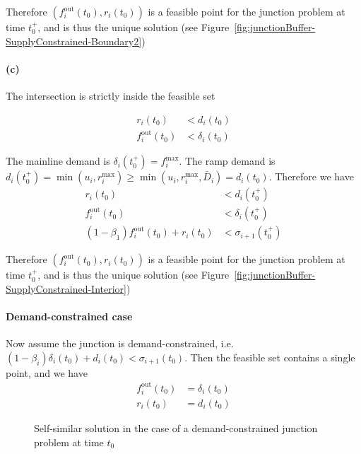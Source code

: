 Therefore $(f_i^{\text{out}}(t_0), r_i(t_0))$ is a feasible point for the junction problem at time $t_0^+$, and is thus the unique solution (see Figure~\ref{fig:junctionBuffer-SupplyConstrained-Boundary2})

\paragraph{(c)} The intersection is strictly inside the feasible set

\begin{align*}
r_i(t_0) &< d_i(t_0) \\
f^{\text{out}}_i(t_0) &< \delta_i(t_0)
\end{align*}

The mainline demand is $\delta_i(t_0^+) = f_i^{\max}$. The ramp demand is $d_i(t_0^+) = \min (u_i, r_i^{\max}) \geq  \min (u_i, r_i^{\max}, \bar{D}_i) = d_i(t_0)$. Therefore we have
\begin{align*}
r_i(t_0) &< d_i(t_0^+) \\
f_i^{\text{out}}(t_0) &< \delta_i(t_0^+) \\
(1-\beta_1)f_i^{\text{out}}(t_0) + r_i(t_0) &< \sigma_{i+1}(t_0^+)
\end{align*}

Therefore $(f_i^{\text{out}}(t_0), r_i(t_0))$ is a feasible point for the junction problem at time $t_0^+$, and is thus the unique solution (see Figure~\ref{fig:junctionBuffer-SupplyConstrained-Interior})


\paragraph{Demand-constrained case}
Now assume the junction is demand-constrained, i.e. $(1-\beta_i)\delta_i(t_0) + d_i(t_0) < \sigma_{i+1}(t_0)$. Then the feasible set contains a single point, and we have
\begin{align*}
f_i^{\text{out}}(t_0) &= \delta_i(t_0) \\
r_i(t_0) &= d_i(t_0)
\end{align*}

\begin{figure}[h]
\centering
\resizebox{.4\columnwidth}{!}{}
\caption{Self-similar solution in the case of a demand-constrained junction problem at time $t_0$}
\label{fig:junctionBuffer-DemandConstrained}
\end{figure}

